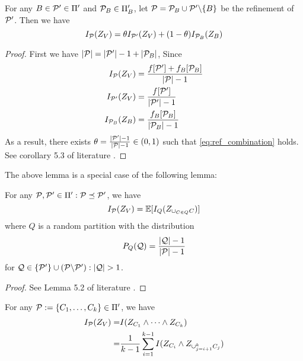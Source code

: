 \begin{lemma}\label{lem:ref_combination}
For any $B \in \P' \in \Pi'$ and $\P_B \in \Pi'_B$, let $\P = \P_B \cup \P' \backslash \{B\} $
be the refinement of $\P'$. Then we have
\begin{equation}\label{eq:ref_combination}
I_{\P}(Z_V) = \theta I_{\P'}(Z_V) + (1-\theta) I_{\P_B}(Z_B)
\end{equation}
\end{lemma}
\begin{proof}
\ifshowNonSelf
	First we have $\abs{\P} = \abs{\P'} -1 + \abs{\P_B}$,
	Since
	\begin{align*}
		I_{\P}(Z_V) & = { f[\P'] + f_B[\P_B] \over \abs{\P} - 1} \\
		I_{\P'}(Z_V) & = { f[\P'] \over \abs{\P'} - 1} \\
		I_{\P_B}(Z_B) & = { f_B[\P_B] \over \abs{\P_B} - 1}
	\end{align*}
	As a result, there exists $\theta = {\abs{\P'} - 1 \over \abs{\P} - 1} \in (0,1)$ such that 
	\eqref{eq:ref_combination} holds.
\else
See corollary 5.3 of literature \cite{ska}.
\fi
\end{proof}
The above lemma is a special case of the following lemma:
\begin{lemma}\label{lem:multi_combination}
For any $\P, \P' \in \Pi' : \P \preceq \P' $, we have
\begin{equation}
I_{\P}(Z_V) = \E[I_{Q}(Z_{\cup_{C\in Q}C})]
\end{equation}
where $Q$ is a random partition with the distribution
\begin{equation}
P_{Q}(\mathcal{Q}) = \frac{\abs{\mathcal{Q} } - 1
	}{\abs{\P} - 1}
\end{equation}
for $\mathcal{Q} \in \{\P' \} \cup (\P \backslash \P'): \abs{\mathcal{Q}}>1$.
\end{lemma}
\begin{proof}
	See Lemma 5.2 of literature \cite{ska}.
\end{proof}
\begin{lemma}\label{lem:mi_split}
For any $\P:=\{C_1, \dots, C_k\} \in \Pi'$, we have
\begin{align}
I_{\P}(Z_V) =& I(Z_{C_1} \wedge \dots \wedge Z_{C_k}) \label{eq:mmi_representation} \\
=& { 1 \over k-1} \sum_{i=1}^{k-1} I(Z_{C_i} \wedge Z_{\cup_{j=i+1}^k C_j}) \label{eq:mi_mmi}
\end{align}
\end{lemma}
